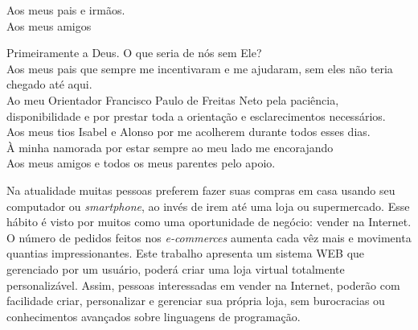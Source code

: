 \documentclass[a4paper,12pt]{monografia}
\begin{document}
%
  
%
\tecnologo {} 
%
 
\unidadeacademica{}
%
%

\maketitle
\begin{dedicatoria}
Aos meus pais e irmãos.\\
Aos meus amigos\\
\end{dedicatoria}

\noindent Primeiramente a Deus. O que seria de nós sem Ele?	\\
Aos meus pais que sempre me incentivaram e me ajudaram, sem eles não teria chegado até aqui.\\
Ao meu Orientador Francisco Paulo de Freitas Neto pela paciência, disponibilidade e por prestar toda a orientação e esclarecimentos necessários.\\
Aos meus tios Isabel e Alonso por me acolherem durante todos esses dias.\\
À minha namorada por estar sempre ao meu lado me encorajando\\
Aos meus amigos e todos os meus parentes pelo apoio.

\newpage


Na atualidade muitas pessoas preferem fazer suas compras em casa usando seu computador ou \textit{smartphone}, ao invés de irem até uma loja ou supermercado. Esse hábito é visto por muitos como uma oportunidade de negócio: vender na Internet. O número de pedidos feitos nos \textit{\textit{e-commerce}s} aumenta cada vêz mais e movimenta quantias impressionantes. Este trabalho apresenta um sistema {WEB} que gerenciado por um usuário, poderá criar uma loja virtual totalmente personalizável. Assim, pessoas interessadas em vender na Internet, poderão com facilidade criar, personalizar e gerenciar sua própria loja, sem burocracias ou conhecimentos avançados sobre linguagens de programação.
\end{document}
